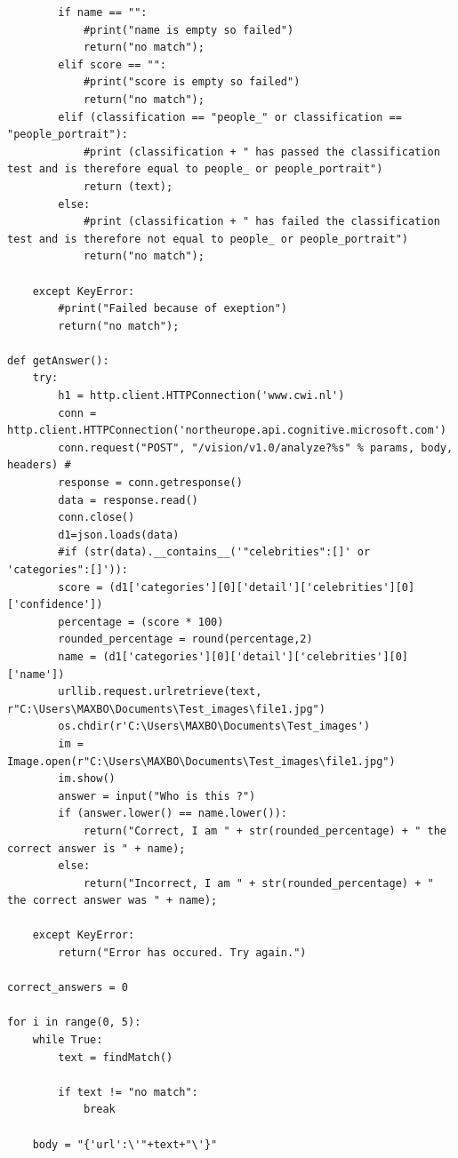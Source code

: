 \documentclass[12pt,a4paper]{article}
\begin{document}
\begin{appendices}
\begin{lstlisting}
        if name == "":  
            #print("name is empty so failed")
            return("no match");  
        elif score == "":  
            #print("score is empty so failed")
            return("no match");  
        elif (classification == "people_" or classification == "people_portrait"):   
            #print (classification + " has passed the classification test and is therefore equal to people_ or people_portrait")
            return (text);  
        else:  
            #print (classification + " has failed the classification test and is therefore not equal to people_ or people_portrait")
            return("no match");
        
    except KeyError:   
        #print("Failed because of exeption")
        return("no match");  
    
def getAnswer():
    try:   
        h1 = http.client.HTTPConnection('www.cwi.nl')
        conn = http.client.HTTPConnection('northeurope.api.cognitive.microsoft.com') 
        conn.request("POST", "/vision/v1.0/analyze?%s" % params, body, headers) #
        response = conn.getresponse() 
        data = response.read() 
        conn.close() 
        d1=json.loads(data)   
        #if (str(data).__contains__('"celebrities":[]' or 'categories":[]')):     
        score = (d1['categories'][0]['detail']['celebrities'][0]['confidence']) 
        percentage = (score * 100) 
        rounded_percentage = round(percentage,2)  
        name = (d1['categories'][0]['detail']['celebrities'][0]['name']) 
        urllib.request.urlretrieve(text, r"C:\Users\MAXBO\Documents\Test_images\file1.jpg")  
        os.chdir(r'C:\Users\MAXBO\Documents\Test_images')
        im = Image.open(r"C:\Users\MAXBO\Documents\Test_images\file1.jpg")  
        im.show()
        answer = input("Who is this ?") 
        if (answer.lower() == name.lower()): 
            return("Correct, I am " + str(rounded_percentage) + " the correct answer is " + name); 
        else: 
            return("Incorrect, I am " + str(rounded_percentage) + " the correct answer was " + name);

    except KeyError:  
        return("Error has occured. Try again.") 
 
correct_answers = 0  
        
for i in range(0, 5):
    while True:  
        text = findMatch()
        
        if text != "no match": 
            break   
    
    body = "{'url':\'"+text+"\'}"  


\end{lstlisting}
\end{appendices}
\end{document}
